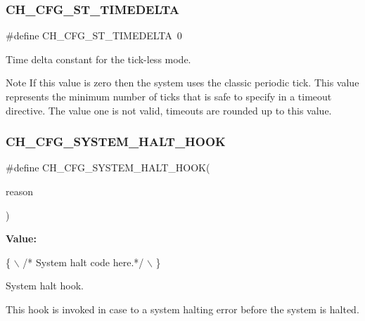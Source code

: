 \subsubsection{\texorpdfstring{C\+H\+\_\+\+C\+F\+G\+\_\+\+S\+T\+\_\+\+T\+I\+M\+E\+D\+E\+L\+TA}{CH\_CFG\_ST\_TIMEDELTA}}
{\footnotesize\ttfamily \#define C\+H\+\_\+\+C\+F\+G\+\_\+\+S\+T\+\_\+\+T\+I\+M\+E\+D\+E\+L\+TA~0}



Time delta constant for the tick-\/less mode. 

\begin{DoxyNote}{Note}
If this value is zero then the system uses the classic periodic tick. This value represents the minimum number of ticks that is safe to specify in a timeout directive. The value one is not valid, timeouts are rounded up to this value. 
\end{DoxyNote}
\hypertarget{group__config_ga03c17b48d4f0444046d41102acb3a54b}{}\label{group__config_ga03c17b48d4f0444046d41102acb3a54b} 
\subsubsection{\texorpdfstring{C\+H\+\_\+\+C\+F\+G\+\_\+\+S\+Y\+S\+T\+E\+M\+\_\+\+H\+A\+L\+T\+\_\+\+H\+O\+OK}{CH\_CFG\_SYSTEM\_HALT\_HOOK}}
{\footnotesize\ttfamily \#define C\+H\+\_\+\+C\+F\+G\+\_\+\+S\+Y\+S\+T\+E\+M\+\_\+\+H\+A\+L\+T\+\_\+\+H\+O\+OK(\begin{DoxyParamCaption}\item[{}]{reason }\end{DoxyParamCaption})}

{\bfseries Value\+:}
\begin{DoxyCode}
\{                                   \(\backslash\)
  \textcolor{comment}{/* System halt code here.*/}                                               \(\backslash\)
\}
\end{DoxyCode}


System halt hook. 

This hook is invoked in case to a system halting error before the system is halted. \hypertarget{group__config_ga033f2f0ca73bee1d11095d27e5e6b007}{}\label{group__config_ga033f2f0ca73bee1d11095d27e5e6b007} 
